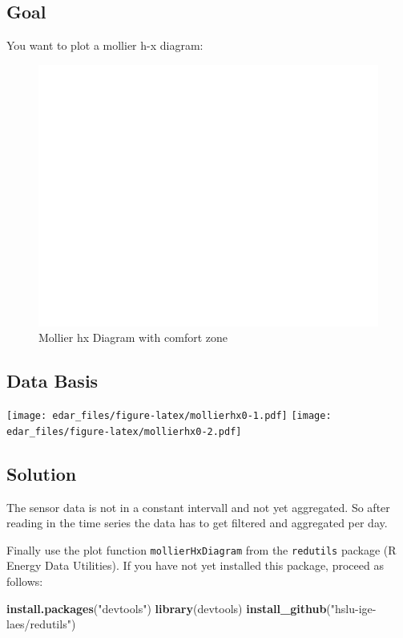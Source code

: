 \documentclass[
]{book}
\newenvironment{Shaded}{\begin{snugshade}}{\end{snugshade}}
\newcommand{\KeywordTok}[1]{\textcolor[rgb]{0.13,0.29,0.53}{\textbf{#1}}}
\newcommand{\NormalTok}[1]{#1}
\newcommand{\StringTok}[1]{\textcolor[rgb]{0.31,0.60,0.02}{#1}}
\let\oldShaded\Shaded
\let\endoldShaded\endShaded
\renewenvironment{Shaded}{\footnotesize\oldShaded}{\endoldShaded}
\begin{document}
\hypertarget{goal-12}{%
\subsection{Goal}\label{goal-12}}

You want to plot a mollier h-x diagram:

\begin{figure}
\includegraphics[width=0.7\linewidth]{images/comfortMollierHx} \caption{Mollier hx Diagram with comfort zone}\label{fig:unnamed-chunk-21}
\end{figure}

\hypertarget{data-basis-12}{%
\subsection{Data Basis}\label{data-basis-12}}

\texttt{[image: edar\_files/figure-latex/mollierhx0-1.pdf]} \texttt{[image: edar\_files/figure-latex/mollierhx0-2.pdf]}

\hypertarget{solution-12}{%
\subsection{Solution}\label{solution-12}}

The sensor data is not in a constant intervall and not yet aggregated. So after reading in the time series the data has to get filtered and aggregated per day.

Finally use the plot function \texttt{mollierHxDiagram} from the \texttt{redutils} package (R Energy Data Utilities).
If you have not yet installed this package, proceed as follows:

\begin{Shaded}
\begin{Highlighting}[]
\KeywordTok{install.packages}\NormalTok{(}\StringTok{"devtools"}\NormalTok{)}
\KeywordTok{library}\NormalTok{(devtools)}
\KeywordTok{install_github}\NormalTok{(}\StringTok{"hslu-ige-laes/redutils"}\NormalTok{)}
\end{Highlighting}
\end{Shaded}
\end{document}
